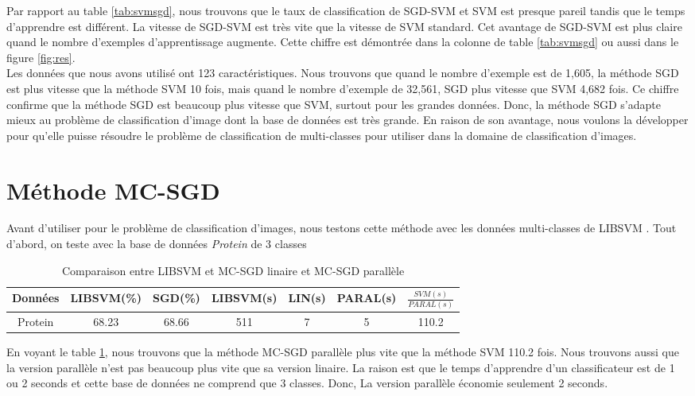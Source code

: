 \pagebreak
Par rapport au table \ref{tab:svmsgd}, nous trouvons que le taux de classification de SGD-SVM et SVM est presque pareil tandis que le temps d'apprendre est différent. La vitesse de SGD-SVM est très vite que la vitesse de SVM standard. Cet avantage de SGD-SVM est plus claire quand le nombre d'exemples d'apprentissage augmente. Cette chiffre est démontrée dans la colonne de table \ref{tab:svmsgd} ou aussi dans le figure \ref{fig:res}.\\

Les données que nous avons utilisé ont 123 caractéristiques. Nous trouvons que quand le nombre d'exemple est de 1,605, la méthode SGD est plus vitesse que la méthode SVM 10 fois, mais quand le nombre d'exemple de 32,561, SGD plus vitesse que SVM 4,682 fois. Ce chiffre confirme que la méthode SGD est beaucoup plus vitesse que SVM, surtout pour les grandes données. Donc, la méthode SGD s'adapte mieux au problème de classification d'image dont la base de données est très grande. En raison de son avantage, nous voulons la développer pour qu'elle puisse résoudre le problème de classification de multi-classes pour utiliser dans la domaine de classification d'images.


\section{Méthode MC-SGD}
Avant d'utiliser pour le problème de classification d'images, nous testons cette méthode avec les données multi-classes de LIBSVM \cite{svmdatamul}. Tout d'abord, on teste avec la base de données \textit{Protein} de 3 classes

\pagebreak
\begin{table}
\begin{center}
    \begin{tabular}{ | c | c | c | c | c | c | c |}
    \hline
    Données & LIBSVM(\%) & SGD(\%) & LIBSVM(s) & LIN(s) & PARAL(s) & $\frac{SVM(s)}{PARAL(s)}$ \\ \hline
    
    Protein & 68.23 & 68.66 & 511 & 7 & 5 & 110.2 \\ \hline
    
    \end{tabular}
\end{center}
\caption{Comparaison entre LIBSVM et MC-SGD linaire et MC-SGD parallèle}
\label{tab:mcsvm}
\end{table}

\pagebreak
En voyant le table \ref{tab:mcsvm}, nous trouvons que la méthode MC-SGD parallèle plus vite que la méthode SVM 110.2 fois. Nous trouvons aussi que la version parallèle n'est pas beaucoup plus vite que sa version linaire. La raison est que le temps d'apprendre d'un classificateur est de 1 ou 2 seconds et cette base de données ne comprend que 3 classes. Donc, La version parallèle économie seulement 2 seconds.\\

